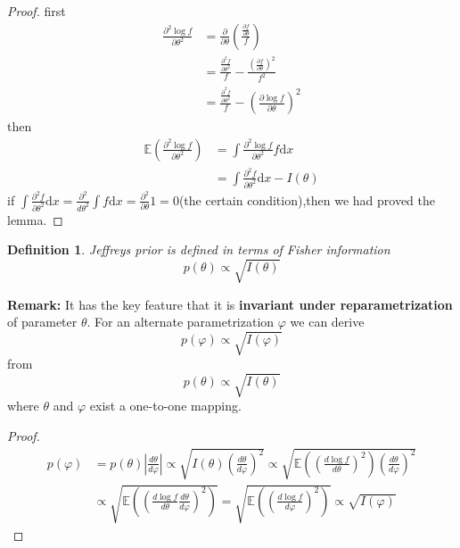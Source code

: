 \documentclass[11pt]{article}
\def\BE{{\mathbb E}}
\newtheorem{definition}{Definition}[section]
\begin{document}
\begin{proof}
first
\begin{align}
\nonumber
\frac{\partial^2\log f}{\partial\theta ^ 2} &= \frac{\partial}{\partial\theta}(\frac{\frac{\partial f}{\partial\theta}}{f}) \\
\nonumber
&= \frac{\frac{\partial^2f}{\partial\theta^2}}{f} - \frac{(\frac{\partial f}{\partial\theta})^2}{f^2}\\
\nonumber
&= \frac{\frac{\partial^2f}{\partial\theta^2}}{f} - (\frac{\partial\log f}{\partial\theta}) ^ 2
\end{align}
then
\begin{align}
\nonumber
\BE(\frac{\partial^2\log f}{\partial\theta ^ 2}) &= \int\frac{\partial^2\log f}{\partial\theta^2}f \mathrm{d}x\\
\nonumber
&= \int \frac{\partial^2f}{\partial\theta^2}\mathrm{d}x - I(\theta)
\end{align}
if $\int \frac{\partial^2f}{\partial\theta^2}\mathrm{d}x = \frac{\partial^2}{d\theta^2}\int f\mathrm{d}x = \frac{\partial^2}{\partial\theta}1 = 0$(the certain condition),then we had proved the lemma.
\end{proof}
\begin{definition}
Jeffreys prior is defined in terms of Fisher information
$$p(\theta) \propto \sqrt{I(\theta)}$$
\end{definition}
\textbf{Remark:} It has the key feature that it is \textbf{invariant under reparametrization} of parameter $\theta$. For an alternate parametrization $\varphi$ we can derive
$$p(\varphi) \propto \sqrt{I(\varphi)}$$
from
$$p(\theta) \propto \sqrt{I(\theta)}$$
where $\theta$ and $\varphi$ exist a one-to-one mapping.
\begin{proof}
\begin{align}
\nonumber
p(\varphi) &= p(\theta)|\frac{d\theta}{d\varphi}| \propto \sqrt{I(\theta)(\frac{d\theta}{d\varphi})^2}
\propto\sqrt{\BE((\frac{d\log f}{d\theta})^2)(\frac{d\theta}{d\varphi})^2} \\
\nonumber
&\propto \sqrt{\BE((\frac{d\log f}{d\theta}\frac{d\theta}{d\varphi})^2)} = \sqrt{\BE((\frac{d\log f}{d\varphi})^2)} \propto \sqrt{I(\varphi)}
\end{align}
\end{proof}
\end{document}
